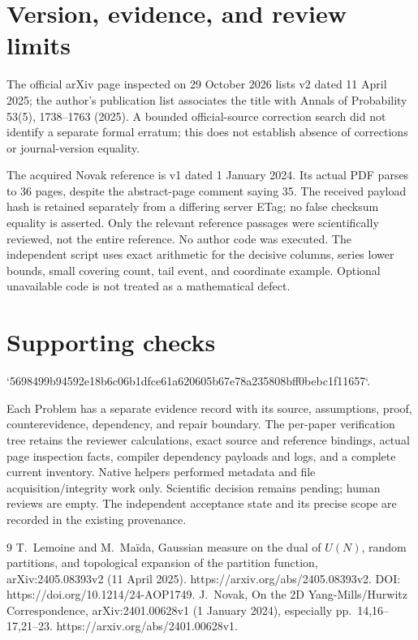 \documentclass[10pt]{article}
\begin{document}
\section*{Version, evidence, and review limits}
The official arXiv page inspected on 29 October 2026 lists v2 dated 11 April 2025; the author’s publication list associates the title with Annals of Probability 53(5), 1738–1763 (2025). A bounded official-source correction search did not identify a separate formal erratum; this does not establish absence of corrections or journal-version equality.\par
The acquired Novak reference is v1 dated 1 January 2024. Its actual PDF parses to 36 pages, despite the abstract-page comment saying 35. The received payload hash is retained separately from a differing server ETag; no false checksum equality is asserted. Only the relevant reference passages were scientifically reviewed, not the entire reference. No author code was executed. The independent script uses exact arithmetic for the decisive columns, series lower bounds, small covering count, tail event, and coordinate example. Optional unavailable code is not treated as a mathematical defect.\par
\section*{Supporting checks}
`5698499b94592e18b6c06b1dfce61a620605b67e78a235808bff0bebc1f11657`.\par
Each Problem has a separate evidence record with its source, assumptions, proof, counterevidence, dependency, and repair boundary. The per-paper verification tree retains the reviewer calculations, exact source and reference bindings, actual page inspection facts, compiler dependency payloads and logs, and a complete current inventory. Native helpers performed metadata and file acquisition/integrity work only. Scientific decision remains pending; human reviews are empty. The independent acceptance state and its precise scope are recorded in the existing provenance.\par
9 T. Lemoine and M. Maïda, Gaussian measure on the dual of \(U(N)\), random partitions, and topological expansion of the partition function, arXiv:2405.08393v2 (11 April 2025). https://arxiv.org/abs/2405.08393v2. DOI: https://doi.org/10.1214/24-AOP1749. J. Novak, On the 2D Yang-Mills/Hurwitz Correspondence, arXiv:2401.00628v1 (1 January 2024), especially pp. 14,16–17,21–23. https://arxiv.org/abs/2401.00628v1.\par
\end{document}
